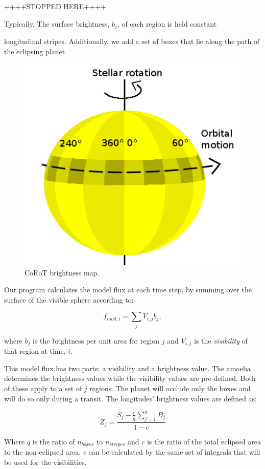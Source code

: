 \documentclass[iop]{emulateapj}
\newcommand{\fmod}{\mbox{$f_{mod,i}$}}
\begin{document}
++++STOPPED HERE++++

Typically, 
The surface brightness, $b_j$, of
each region is held constant 

longitudinal stripes. Additionally, we add a set of boxes that lie along the path of the eclipsing planet

\begin{figure}[h]
	\centering
	\includegraphics[width=.5\textwidth]{images/modelGeometry.png}
	\caption{CoRoT brightness map.}
	\label{CoRoT}
\end{figure}


Our program calculates the model flux at each time step, by summing over the surface of the visible sphere according to:

\begin{equation}
	\fmod = \sum_j V_{i,j}b_j, 
\end{equation}

where $b_j$ is the brightness per unit area for region $j$ and $V_{i,j}$ is the {\it visibility} of that region at time, $i$.


This model flux has two parts: a visibility and a brightness value. The amoeba determines the brightness values while the visibility values are pre-defined. Both of these apply to a set of $j$ regions. 
The planet will occlude only the boxes and will do so only during a transit. The longitudes' brightness values are defined as:

\begin{equation}
Z_j = \frac{S_j - \frac{c}{q} \sum_{j=1}^{q}B_j}{1- c}
\end{equation}

Where $q$ is the ratio of $n_{boxes}$ to $n_{stripes}$ and $c$ is the ratio of the total eclipsed area to the non-eclipsed area. $c$ can be calculated by the same set of integrals that will be used for the visibilities.
\end{document}
